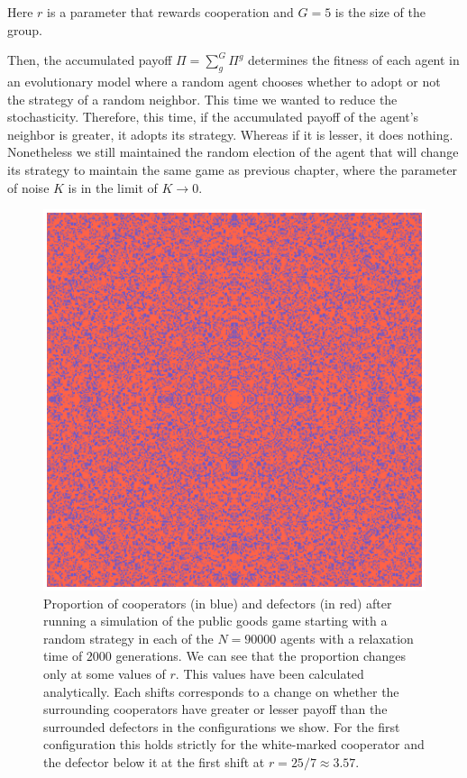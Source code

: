 Here $r$ is a parameter that rewards cooperation and $G = 5$ is the size of the group.

Then, the accumulated payoff $\Pi=\sum_g^G \Pi^g$ determines the fitness of each agent in an evolutionary model where a random agent chooses whether to adopt or not the strategy of a random neighbor. This time we wanted to reduce the stochasticity. Therefore, this time, if the accumulated payoff of the agent's neighbor is greater, it adopts its strategy. Whereas if it is lesser, it does nothing. Nonetheless we still maintained the random election of the agent that will change its strategy to maintain the same game as previous chapter, where the parameter of noise $K$ is in the limit of $K \to 0$.


\begin{figure}
	\centering
	\includegraphics[width=1\linewidth]{Images/P3/PGG_Proportion.eps}
	\caption{Proportion of cooperators (in blue) and defectors (in red) after running a simulation of the public goods game starting with a random strategy in each of the $N=90000$ agents with a relaxation time of $2000$ generations. We can see that the proportion changes only at some values of $r$. This values have been calculated analytically. Each shifts corresponds to a change on whether the surrounding cooperators have greater or lesser payoff than the surrounded defectors in the configurations we show. For the first configuration this holds strictly for the white-marked cooperator and the defector below it at the first shift at $r=25/7\approx3.57$.}
	\label{fig:PGG_Proportion}
\end{figure}


